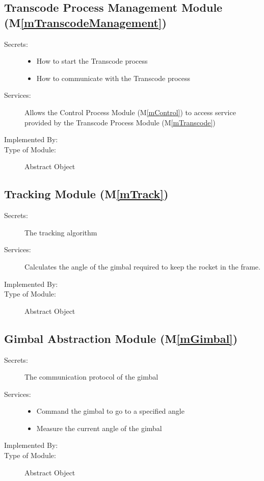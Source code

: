 \documentclass[12pt, titlepage]{article}
\newcommand{\mref}[1]{M\ref{#1}}
\begin{document}
\subsection{Transcode Process Management Module (\mref{mTranscodeManagement})}

\begin{description}
  \item[Secrets:] \leavevmode
        \begin{itemize}
          \item How to start the Transcode process
          \item How to communicate with the Transcode process
        \end{itemize}
  \item[Services:] Allows the Control Process Module (\mref{mControl}) to access
        service provided by the Transcode Process Module (\mref{mTranscode})
  \item[Implemented By:] \progname
  \item[Type of Module:] Abstract Object
\end{description}

\subsection{Tracking Module (\mref{mTrack})}

\begin{description}
  \item[Secrets:] The tracking algorithm
  \item[Services:] Calculates the angle of the gimbal required to keep the rocket in
        the frame.
  \item[Implemented By:] \progname
  \item[Type of Module:] Abstract Object
\end{description}

\subsection{Gimbal Abstraction Module (\mref{mGimbal})}

\begin{description}
  \item[Secrets:] The communication protocol of the gimbal
  \item[Services:] \leavevmode
        \begin{itemize}
          \item Command the gimbal to go to a specified angle
          \item Measure the current angle of the gimbal
        \end{itemize}
  \item[Implemented By:] \progname
  \item[Type of Module:] Abstract Object
\end{description}
\end{document}
